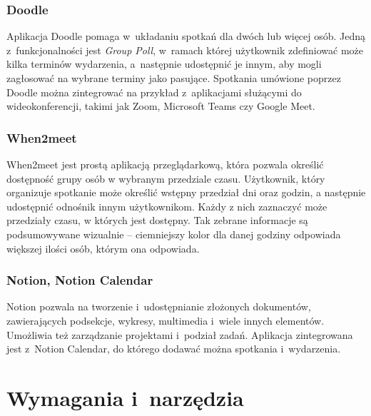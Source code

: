 \documentclass[a4paper,twoside,12pt]{book}
\newcommand{\obcy}[1]{\emph{#1}}
\newcommand{\english}[1]{{\selectlanguage{british}\obcy{#1}}}
\begin{document}
\subsection{Doodle}
Aplikacja Doodle pomaga w~układaniu spotkań dla dwóch lub więcej osób. Jedną z~funkcjonalności jest \english{Group Poll}, w~ramach której użytkownik zdefiniować może kilka terminów wydarzenia, a~następnie udostępnić je innym, aby mogli zagłosować na wybrane terminy jako pasujące. Spotkania umówione poprzez Doodle można zintegrować na przykład z~aplikacjami służącymi do wideokonferencji, takimi jak Zoom, Microsoft Teams czy Google Meet.
\subsection{When2meet}
When2meet jest prostą aplikacją przeglądarkową, która pozwala określić dostępność grupy osób w wybranym przedziale czasu. Użytkownik, który organizuje spotkanie może określić wstępny przedział dni oraz godzin, a następnie udostępnić odnośnik innym użytkownikom. Każdy z nich zaznaczyć może przedziały czasu, w których jest dostępny. Tak zebrane informacje są podsumowywane wizualnie -- ciemniejszy kolor dla danej godziny odpowiada większej ilości osób, którym ona odpowiada.
\subsection{Notion, Notion Calendar}
Notion pozwala na tworzenie i~udostępnianie złożonych dokumentów, zawierających podsekcje, wykresy, multimedia i~wiele innych elementów. Umożliwia też zarządzanie projektami i~podział zadań. Aplikacja zintegrowana jest z~Notion Calendar, do którego dodawać można spotkania i~wydarzenia.


\chapter{Wymagania i~narzędzia}
\label{ch:wymagania-i-narzedzia}

\end{document}
